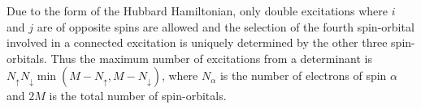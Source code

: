 \documentclass[a4paper, 11pt]{article}
\begin{document}
Due to the form of the Hubbard Hamiltonian, only double excitations where $i$ and $j$ are of opposite spins are allowed and the selection of the fourth spin-orbital involved in a connected excitation is uniquely determined by the other three spin-orbitals.  Thus the maximum number of excitations from a determinant is $N_\uparrow N_\downarrow \min( M - N_\uparrow, M - N_\downarrow)$, where $N_\alpha$ is the number of electrons of spin $\alpha$ and $2M$ is the total number of spin-orbitals.
\end{document}

